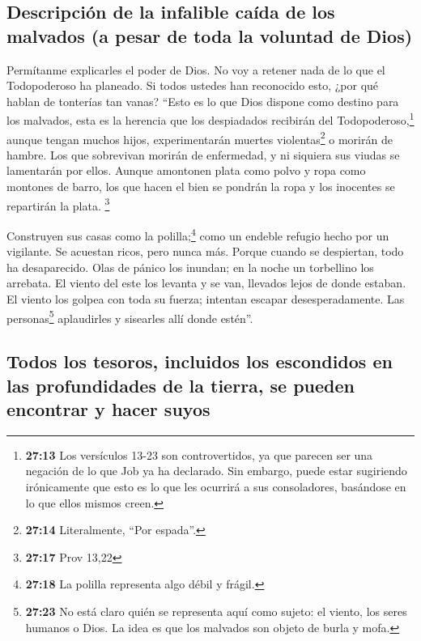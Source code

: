 \hypertarget{descripciuxf3n-de-la-infalible-cauxedda-de-los-malvados-a-pesar-de-toda-la-voluntad-de-dios}{%
\subsection{Descripción de la infalible caída de los malvados (a pesar
de toda la voluntad de
Dios)}\label{descripciuxf3n-de-la-infalible-cauxedda-de-los-malvados-a-pesar-de-toda-la-voluntad-de-dios}}

 Permítanme explicarles el poder de Dios. No voy a
retener nada de lo que el Todopoderoso ha planeado.  Si
todos ustedes han reconocido esto, ¿por qué hablan de tonterías tan
vanas?  ``Esto es lo que Dios dispone como destino para
los malvados, esta es la herencia que los despiadados recibirán del
Todopoderoso,\footnote{\textbf{27:13} Los versículos 13-23 son
  controvertidos, ya que parecen ser una negación de lo que Job ya ha
  declarado. Sin embargo, puede estar sugiriendo irónicamente que esto
  es lo que les ocurrirá a sus consoladores, basándose en lo que ellos
  mismos creen.}  aunque tengan muchos hijos,
experimentarán muertes violentas\footnote{\textbf{27:14} Literalmente,
  ``Por espada''.} o morirán de hambre.  Los que
sobrevivan morirán de enfermedad, y ni siquiera sus viudas se lamentarán
por ellos.  Aunque amontonen plata como polvo y ropa como
montones de barro,  los que hacen el bien se pondrán la
ropa y los inocentes se repartirán la plata. \footnote{\textbf{27:17}
  Prov 13,22}

 Construyen sus casas como la polilla;\footnote{\textbf{27:18}
  La polilla representa algo débil y frágil.} como un endeble refugio
hecho por un vigilante.  Se acuestan ricos, pero nunca
más. Porque cuando se despiertan, todo ha desaparecido. 
Olas de pánico los inundan; en la noche un torbellino los arrebata.
 El viento del este los levanta y se van, llevados lejos
de donde estaban.  El viento los golpea con toda su
fuerza; intentan escapar desesperadamente.  Las
personas\footnote{\textbf{27:23} No está claro quién se representa aquí
  como sujeto: el viento, los seres humanos o Dios. La idea es que los
  malvados son objeto de burla y mofa.} aplaudirles y sisearles allí
donde estén''.

\hypertarget{todos-los-tesoros-incluidos-los-escondidos-en-las-profundidades-de-la-tierra-se-pueden-encontrar-y-hacer-suyos}{%
\subsection{Todos los tesoros, incluidos los escondidos en las
profundidades de la tierra, se pueden encontrar y hacer
suyos}\label{todos-los-tesoros-incluidos-los-escondidos-en-las-profundidades-de-la-tierra-se-pueden-encontrar-y-hacer-suyos}}

